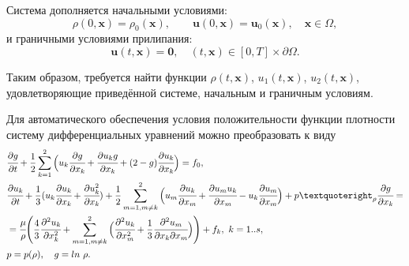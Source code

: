\documentclass[a4paper,12pt]{extarticle}
\begin{document}
Система дополняется начальными условиями:
\[
\rho(0,\mathbf{x}) = \rho_0(\mathbf{x}), \qquad \mathbf{u}(0,\mathbf{x}) = \mathbf{u}_0(\mathbf{x}), \quad \mathbf{x} \in \Omega,
\]
и граничными условиями прилипания:
\[
\mathbf{u}(t,\mathbf{x}) = \mathbf{0}, \quad (t,\mathbf{x}) \in [0,T] \times \partial\Omega.
\]

Таким образом, требуется найти функции $\rho(t,\mathbf{x})$, $u_1(t,\mathbf{x})$, $u_2(t,\mathbf{x})$, удовлетворяющие приведённой системе, начальным и граничным условиям.

Для автоматического обеспечения условия положительности функции плотности систему дифференциальных уравнений можно преобразовать к виду
\begin{align*}
	& \cfrac{\partial g}{\partial t} + \frac{1}{2}\sum_{k=1}^{2}\Big(u_k\cfrac{\partial g}{\partial x_k}+
	\cfrac{\partial u_k g}{\partial x_k} + (2-g)\cfrac{\partial u_k}{\partial x_k}\Big) = f_0,\\
	& \cfrac{\partial u_k}{\partial t} + \frac{1}{3}(u_k\cfrac{\partial u_k}{\partial x_k} + 
	\cfrac{\partial u_k^2}{\partial x_k})
	+ \frac{1}{2}\sum_{m=1,m\neq k}^{2}\Big( u_m\cfrac{\partial u_k}{\partial x_m}+
	\cfrac{\partial u_m u_k}{\partial x_m} - u_k\cfrac{\partial u_m}{\partial x_m}\Big)
	+ p’_{\rho } \cfrac{\partial g}{\partial x_k} = \\
	& = \cfrac{\mu}{\rho}\Bigg( \frac{4}{3} \cfrac{\partial^2 u_k}{\partial x_k^2} + 
	\sum_{m=1,m\neq k}^{2}\Big( \cfrac{\partial^2 u_k}{\partial x_m^2} + 
	\frac{1}{3} \cfrac{\partial^2 u_m}{\partial x_k \partial x_m} \Big)\Bigg) + f_k,\ k = 1..s,\\
	& p = p(\rho), \quad g = ln\ \rho.
\end{align*}
\end{document}
